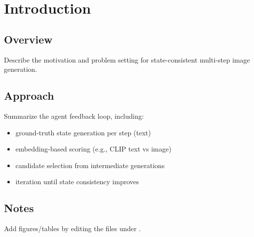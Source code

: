 \chapter{Introduction}


\section{Overview}
Describe the motivation and problem setting for state-consistent multi-step image generation.

\section{Approach}
Summarize the agent feedback loop, including:
\begin{itemize}
  \item ground-truth state generation per step (text)
  \item embedding-based scoring (e.g., CLIP text vs image)
  \item candidate selection from intermediate generations
  \item iteration until state consistency improves
\end{itemize}

\section{Notes}
Add figures/tables by editing the files under \texttt{}.

